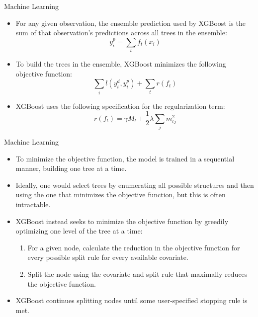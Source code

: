 \documentclass[aspectratio=169, xcolor=dvipsnames]{beamer}
\begin{document}
\begin{frame}{Machine Learning}
\begin{itemize}
\item For any given observation, the ensemble prediction used by XGBoost is the
sum of that observation's predictions across all trees in the ensemble:
\begin{equation*}
y_i^p = \sum_t f_t(x_i)
\end{equation*}
\item To build the trees in the ensemble, XGBoost minimizes the following objective function:
\begin{equation*}
\sum_i l(y_i^d, y_i^p) + \sum_t r(f_t)
\end{equation*}
\item XGBoost uses the following specification for the regularization term:
\begin{equation*}
r(f_t) = \gamma M_t + \frac{1}{2}\lambda \sum_j m_{tj}^2
\end{equation*}
\end{itemize}
\end{frame}

\begin{frame}{Machine Learning}
\begin{itemize}
\item To minimize the objective function, the model is trained in a sequential 
manner, building one tree at a time.
\item Ideally, one would select trees by enumerating all possible structures and then
using the one that minimizes the objective function, but this is often intractable.
\item XGBoost instead seeks to minimize the objective function by greedily optimizing
one level of the tree at a time:
\begin{enumerate}
\item For a given node, calculate the reduction in the objective function for every possible 
split rule for every available covariate.
\item Split the node using the covariate and split rule that maximally reduces the 
objective function.
\end{enumerate}
\item XGBoost continues splitting nodes until some user-specified stopping rule is
met.
\end{itemize}
\end{frame}
\end{document}
